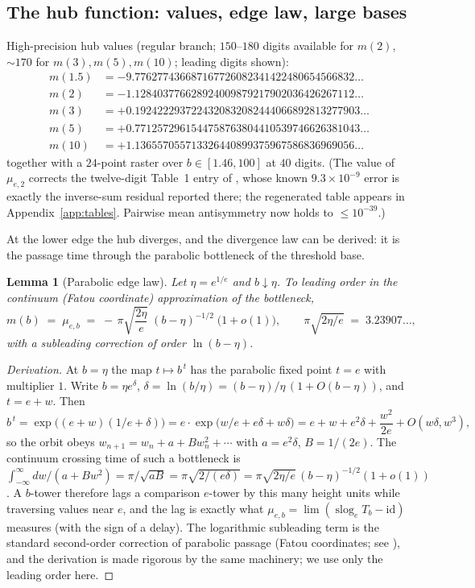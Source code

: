 \documentclass[11pt,a4paper]{article}
\newtheorem{lemma}[theorem]{Lemma}
\theoremstyle{definition}
\theoremstyle{remark}
\newcommand{\slog}{\operatorname{slog}}
\begin{document}
\subsection{The hub function: values, edge law, large bases}

High-precision hub values (regular branch; $150$--$180$ digits available for $m(2)$, $\sim170$
for $m(3),m(5),m(10)$; leading digits shown):
\[
\begin{aligned}
m(1.5)&=-9.776277436687167726082341422480654566832\ldots\\
m(2)&=-1.128403776628924009879217902036426267112\ldots\\
m(3)&=+0.1924222937224320832082444066892813277903\ldots\\
m(5)&=+0.7712572961544758763804410539746626381043\ldots\\
m(10)&=+1.136557055713326440899375967586836969056\ldots
\end{aligned}
\]
together with a $24$-point raster over $b\in[1.46,100]$ at $40$ digits. (The value of
$\mu_{e,2}$ corrects the twelve-digit Table~1 entry of \cite{phaselaw}, whose known
$9.3\times10^{-9}$ error is exactly the inverse-sum residual reported there; the regenerated
table appears in Appendix~\ref{app:tables}. Pairwise mean antisymmetry now holds to
$\le10^{-39}$.)

At the lower edge the hub diverges, and the divergence law can be derived: it is the passage
time through the parabolic bottleneck of the threshold base.

\begin{lemma}[Parabolic edge law]\label{lem:edge}
Let $\eta=e^{1/e}$ and $b\downarrow\eta$. To leading order in the continuum (Fatou
coordinate) approximation of the bottleneck,
\[
m(b)\;=\;\mu_{e,b}\;=\;-\,\pi\sqrt{\frac{2\eta}{e}}\;(b-\eta)^{-1/2}\;
\bigl(1+o(1)\bigr),
\qquad
\pi\sqrt{2\eta/e}\;=\;3.23907\ldots,
\]
with a subleading correction of order $\ln(b-\eta)$.
\end{lemma}

\begin{proof}[Derivation]
At $b=\eta$ the map $t\mapsto b^{\,t}$ has the parabolic fixed point $t=e$ with multiplier
$1$. Write $b=\eta e^{\delta}$, $\delta=\ln(b/\eta)=(b-\eta)/\eta\,(1+O(b-\eta))$, and
$t=e+w$. Then
\[
b^{\,t}=\exp\bigl((e+w)(1/e+\delta)\bigr)
=e\cdot\exp\bigl(w/e+e\delta+w\delta\bigr)
=e+w+e^2\delta+\frac{w^2}{2e}+O(w\delta,w^3),
\]
so the orbit obeys $w_{n+1}=w_n+a+Bw_n^2+\cdots$ with $a=e^2\delta$, $B=1/(2e)$. The
continuum crossing time of such a bottleneck is
$\int_{-\infty}^{\infty}dw/(a+Bw^2)=\pi/\sqrt{aB}=\pi\sqrt{2/(e\delta)}
=\pi\sqrt{2\eta/e}\,(b-\eta)^{-1/2}(1+o(1))$. A $b$-tower therefore lags a comparison
$e$-tower by this many height units while traversing values near $e$, and the lag is exactly
what $\mu_{e,b}=\lim(\slog_e T_b-\mathrm{id})$ measures (with the sign of a delay). The
logarithmic subleading term is the standard second-order correction of parabolic passage
(Fatou coordinates; see \cite[\S10]{milnor}), and the derivation is made rigorous by the same
machinery; we use only the leading order here.
\end{proof}
\end{document}
